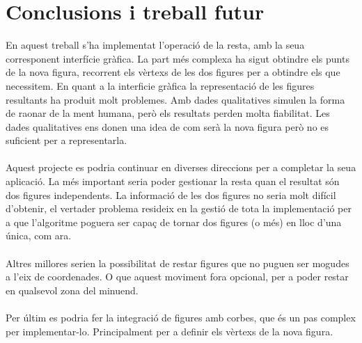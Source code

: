 \documentclass{article}
\begin{document}
\section{Conclusions i treball futur}
En aquest treball s'ha implementat l'operació de la resta, amb la seua corresponent interfície gràfica.
La part més complexa ha sigut obtindre els punts de la nova figura, recorrent els vèrtexs de les dos figures per a obtindre els que necessitem.
En quant a la interficie gràfica la representació de les figures resultants ha produit molt problemes.
Amb dades qualitatives simulen la forma de raonar de la ment humana, però els resultats perden molta fiabilitat.
Les dades qualitatives ens donen una idea de com serà la nova figura però no es suficient per a representarla.
\\
\\
Aquest projecte es podria continuar en diverses direccions per a completar la seua aplicació.
La més important seria poder gestionar la resta quan el resultat són dos figures independents.
La informació de les dos figures no seria molt difícil d'obtenir, el vertader problema resideix en la gestió de tota la implementació per a que l'algoritme poguera ser capaç de tornar dos figures (o més) en lloc d'una única, com ara.
\\
\\
Altres millores serien la possibilitat de restar figures que no puguen ser mogudes a l'eix de coordenades.
O que aquest moviment fora opcional, per a poder restar en qualsevol zona del minuend.
\\
\\
Per últim es podria fer la integració de figures amb corbes,
 que és un pas complex per implementar-lo.
Principalment per a definir els vèrtexs de la nova figura.
 
\end{document}
